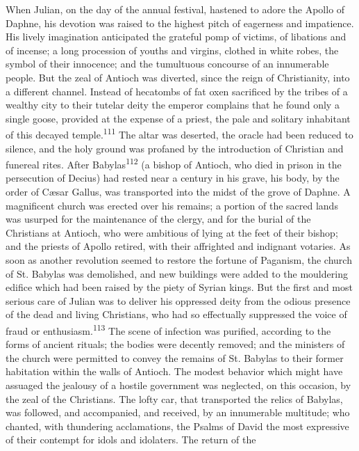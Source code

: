 When Julian, on the day of the annual festival, hastened to adore
the Apollo of Daphne, his devotion was raised to the highest
pitch of eagerness and impatience. His lively imagination
anticipated the grateful pomp of victims, of libations and of
incense; a long procession of youths and virgins, clothed in
white robes, the symbol of their innocence; and the tumultuous
concourse of an innumerable people. But the zeal of Antioch was
diverted, since the reign of Christianity, into a different
channel. Instead of hecatombs of fat oxen sacrificed by the
tribes of a wealthy city to their tutelar deity the emperor
complains that he found only a single goose, provided at the
expense of a priest, the pale and solitary inhabitant of this
decayed temple.\textsuperscript{111} The altar was deserted, the oracle had been
reduced to silence, and the holy ground was profaned by the
introduction of Christian and funereal rites. After Babylas\textsuperscript{112}
(a bishop of Antioch, who died in prison in the persecution of
Decius) had rested near a century in his grave, his body, by the
order of Cæsar Gallus, was transported into the midst of the
grove of Daphne. A magnificent church was erected over his
remains; a portion of the sacred lands was usurped for the
maintenance of the clergy, and for the burial of the Christians
at Antioch, who were ambitious of lying at the feet of their
bishop; and the priests of Apollo retired, with their affrighted
and indignant votaries. As soon as another revolution seemed to
restore the fortune of Paganism, the church of St. Babylas was
demolished, and new buildings were added to the mouldering
edifice which had been raised by the piety of Syrian kings. But
the first and most serious care of Julian was to deliver his
oppressed deity from the odious presence of the dead and living
Christians, who had so effectually suppressed the voice of fraud
or enthusiasm.\textsuperscript{113} The scene of infection was purified, according
to the forms of ancient rituals; the bodies were decently
removed; and the ministers of the church were permitted to convey
the remains of St. Babylas to their former habitation within the
walls of Antioch. The modest behavior which might have assuaged
the jealousy of a hostile government was neglected, on this
occasion, by the zeal of the Christians. The lofty car, that
transported the relics of Babylas, was followed, and accompanied,
and received, by an innumerable multitude; who chanted, with
thundering acclamations, the Psalms of David the most expressive
of their contempt for idols and idolaters. The return of the
